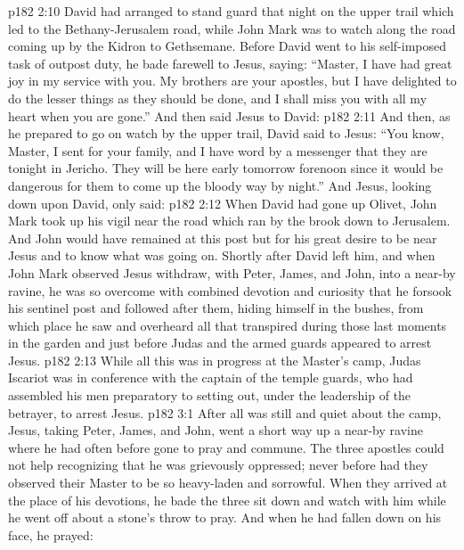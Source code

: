\vs p182 2:10 \pc David had arranged to stand guard that night on the upper trail which led to the Bethany\hyp{}Jerusalem road, while John Mark was to watch along the road coming up by the Kidron to Gethsemane. Before David went to his self\hyp{}imposed task of outpost duty, he bade farewell to Jesus, saying: “Master, I have had great joy in my service with you. My brothers are your apostles, but I have delighted to do the lesser things as they should be done, and I shall miss you with all my heart when you are gone.” And then said Jesus to David: 
\vs p182 2:11 And then, as he prepared to go on watch by the upper trail, David said to Jesus: “You know, Master, I sent for your family, and I have word by a messenger that they are tonight in Jericho. They will be here early tomorrow forenoon since it would be dangerous for them to come up the bloody way by night.” And Jesus, looking down upon David, only said: 
\vs p182 2:12 \pc When David had gone up Olivet, John Mark took up his vigil near the road which ran by the brook down to Jerusalem. And John would have remained at this post but for his great desire to be near Jesus and to know what was going on. Shortly after David left him, and when John Mark observed Jesus withdraw, with Peter, James, and John, into a near-by ravine, he was so overcome with combined devotion and curiosity that he forsook his sentinel post and followed after them, hiding himself in the bushes, from which place he saw and overheard all that transpired during those last moments in the garden and just before Judas and the armed guards appeared to arrest Jesus.
\vs p182 2:13 \pc While all this was in progress at the Master’s camp, Judas Iscariot was in conference with the captain of the temple guards, who had assembled his men preparatory to setting out, under the leadership of the betrayer, to arrest Jesus.
\vs p182 3:1 After all was still and quiet about the camp, Jesus, taking Peter, James, and John, went a short way up a near-by ravine where he had often before gone to pray and commune. The three apostles could not help recognizing that he was grievously oppressed; never before had they observed their Master to be so heavy\hyp{}laden and sorrowful. When they arrived at the place of his devotions, he bade the three sit down and watch with him while he went off about a stone’s throw to pray. And when he had fallen down on his face, he prayed: 
